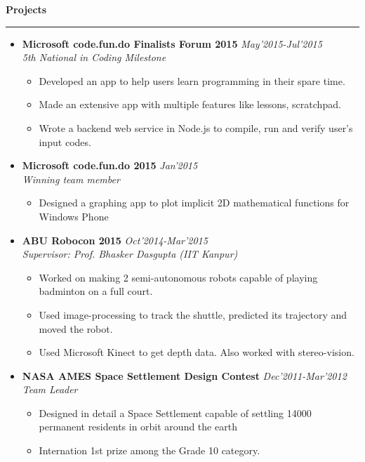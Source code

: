 \documentclass[11pt,a4paper]{article}
\begin{document}
\vspace{5mm}

\textbf{\Large{Projects}}\\
\rule{\textwidth}{01.0pt}
\begin {itemize}

\item \textbf{\large{Microsoft code.fun.do Finalists Forum 2015}} \hfill\textit{ May'2015-Jul'2015}\\ \emph{5th National in Coding Milestone}
    \begin{itemize}
    \setlength \itemsep{0em}
    \item Developed an app to help users learn programming in their spare time.
    \item Made an extensive app with multiple features like lessons, scratchpad.
    \item Wrote a backend web service in Node.js to compile, run and verify user's input codes.
\\
    \end{itemize}

\item \textbf{\large{Microsoft code.fun.do 2015}} \hfill\textit{ Jan'2015}\\ \emph{Winning team member}
    \begin{itemize}
    \setlength \itemsep{0em}
    \item Designed a graphing app to plot implicit 2D mathematical functions for Windows Phone
\\
    \end{itemize}

\item \textbf{\large{ABU Robocon 2015}} \hfill\textit{ Oct'2014-Mar'2015}\\ \emph{Supervisor: Prof. Bhasker Dasgupta (IIT Kanpur)}
    \begin{itemize}
    \setlength \itemsep{0em}
    \item Worked on making 2 semi-autonomous robots capable of playing badminton on a full court.
    \item Used image-processing to track the shuttle, predicted its trajectory and moved the robot.
    \item Used Microsoft Kinect to get depth data. Also worked with stereo-vision.
\\
    \end{itemize}

\item \textbf{\large{NASA AMES Space Settlement Design Contest}} \hfill\textit{ Dec'2011-Mar'2012}\\ \emph{Team Leader}
    \begin{itemize}
    \setlength \itemsep{0em}
    \item Designed in detail a Space Settlement capable of settling 14000 permanent residents in orbit around the earth
    \item Internation 1st prize among the Grade 10 category.
\\
    \end{itemize}


\end{itemize}
\end{document}
